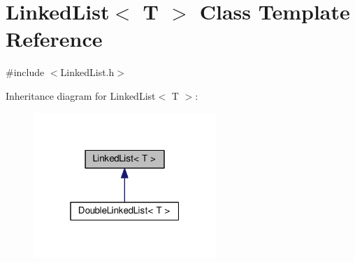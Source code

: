\hypertarget{classLinkedList}{}\section{Linked\+List$<$ T $>$ Class Template Reference}
\label{classLinkedList}


{\ttfamily \#include $<$Linked\+List.\+h$>$}



Inheritance diagram for Linked\+List$<$ T $>$\+:
\nopagebreak
\begin{figure}[H]
\begin{center}
\leavevmode
\includegraphics[width=196pt]{classLinkedList__inherit__graph}
\end{center}
\end{figure}
